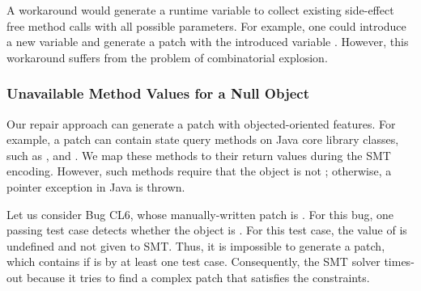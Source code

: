 \begin{table}[!t]
\centering
\caption{Sample of test cases for Bug PL3}
\label{tab:test-pl3}

\end{table}

  

A workaround would generate a runtime variable to collect existing side-effect free method calls with all possible parameters. For example, one could introduce a new variable  and generate a patch with the introduced variable . However, this workaround suffers from the problem of combinatorial explosion.

\subsubsection{Unavailable Method Values for a Null Object}
\label{subsubsect:limit-cl6}

Our repair approach can generate a patch with objected-oriented features. For example, a patch can contain 
state query methods on Java core library classes, such as ,  and . We map these methods to their return values during the SMT encoding. However, such methods require that the object is not ; otherwise, a  pointer exception in Java is thrown. 

Let us consider Bug CL6, whose manually-written patch is . For this bug, one passing test case detects whether the object  is . For this test case, the value of  is undefined and not given to SMT. Thus, it is impossible to generate a patch, which contains  if  is  by at least one test case. Consequently, the SMT solver times-out because it tries to find a complex patch that satisfies the constraints. 

